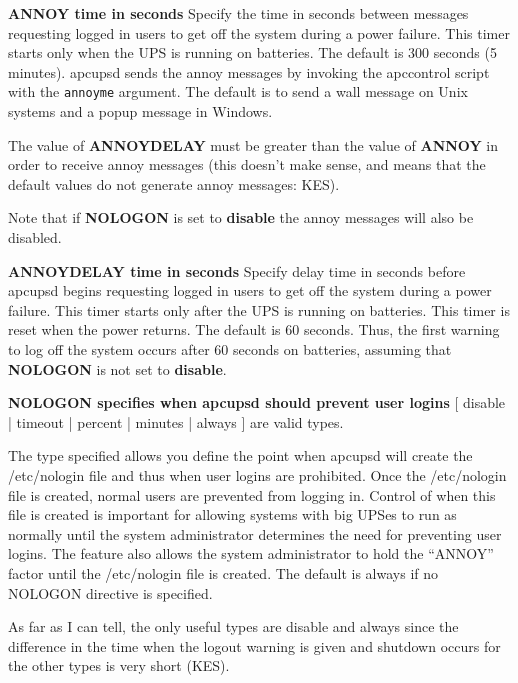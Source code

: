 \begin{description}

\item {\bf ANNOY \lt{}time in seconds\gt{}}
Specify the time in seconds between messages requesting logged in users to get
off the system during a power failure. This timer starts only when the UPS is
running on batteries. The default is 300 seconds (5 minutes). apcupsd sends
the annoy messages by invoking the apccontrol script with the {\tt annoyme}
argument. The default is to send a wall message on Unix systems and a popup
message in Windows.  

The value of {\bf ANNOYDELAY} must be greater than the value of {\bf ANNOY} in
order to receive annoy messages (this doesn't make sense, and means that the
default values do not generate annoy messages: KES).  

Note that if {\bf NOLOGON} is set to {\bf disable} the annoy messages will
also be disabled.  

\item {\bf ANNOYDELAY \lt{}time in seconds\gt{}}
Specify delay time in seconds before apcupsd begins requesting logged in users
to get off the system during a power failure. This timer starts only after the
UPS is running on batteries. This timer is reset when the power returns. The
default is 60 seconds. Thus, the first warning to log off the system occurs
after 60 seconds on batteries, assuming that {\bf NOLOGON} is not set to {\bf
disable}.  

\item {\bf NOLOGON \lt{}specifies when apcupsd should prevent user
logins\gt{}}
[ disable | timeout | percent | minutes | always ] are valid types.  

The type specified allows you define the point when apcupsd will create the
/etc/nologin file and thus when user logins are prohibited. Once the
/etc/nologin file is created, normal users are prevented from logging in.
Control of when this file is created is important for allowing systems with
big UPSes to run as normally until the system administrator determines the
need for preventing user logins. The feature also allows the system
administrator to hold the ``ANNOY'' factor until the /etc/nologin file is
created. The default is always if no NOLOGON directive is specified.  

As far as I can tell, the only useful types are disable and always since the
difference in the time when the logout warning is given and shutdown occurs
for the other types is very short (KES).  


\end{description}
